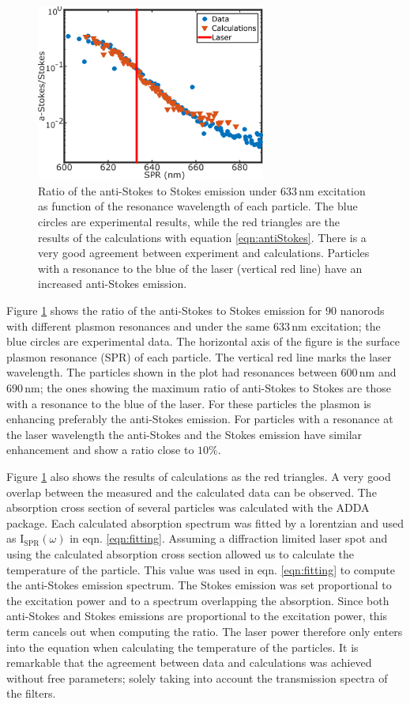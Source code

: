 \documentclass[journal=nalefd,manuscript=letter]{achemso}
\newcommand{\nm}{\ensuremath{\,\textrm{nm}}}
\begin{document}
\begin{figure}[tp] \centering
\includegraphics[width=75.5mm]{Figures/Supplementary/02_AS_vs_S_SPR/02_AS_vs_S_SPR.png}
\caption{Ratio of the anti-Stokes to Stokes emission under $633\nm$ excitation
as function of the resonance wavelength of each particle.
The blue circles are experimental results, while the red triangles are the
results of the calculations with equation \ref{eqn:antiStokes}. There is a very
good agreement between experiment and calculations. Particles with a resonance
to the blue of the laser (vertical red line) have an increased anti-Stokes
emission.}
	\label{fig:ASS-ratio}
\end{figure}

Figure \ref{fig:ASS-ratio} shows the ratio of the anti-Stokes to Stokes emission
for $90$ nanorods with different plasmon resonances and under the same $633\nm$
excitation; the blue circles are experimental data. The horizontal axis of the
figure is the surface plasmon resonance (SPR) of each particle. The vertical red
line marks the laser wavelength. The particles shown in the plot had resonances
between $600\nm$ and $690\nm$; the ones showing the maximum ratio of anti-Stokes
to Stokes are those with a resonance to the blue of the laser. For these
particles the plasmon is enhancing preferably the anti-Stokes emission. For
particles with a resonance at the laser wavelength the anti-Stokes and the
Stokes emission have similar enhancement and show a ratio close to $10\%$. 

Figure \ref{fig:ASS-ratio} also shows the results of calculations as the red
triangles. A very good overlap between the measured and the calculated data can
be observed. The absorption cross section of several particles was calculated
with the ADDA package\cite{Yurkin2011}. Each calculated absorption spectrum was
fitted by a lorentzian and used as $\textrm{I}_{\textrm{SPR}}(\omega)$ in eqn.
\ref{eqn:fitting}. Assuming a diffraction limited laser spot and using the
calculated absorption cross section allowed us to calculate the temperature of
the particle. This value was used in eqn. \ref{eqn:fitting} to compute the
anti-Stokes emission spectrum. The Stokes emission was set proportional to the
excitation power and to a spectrum overlapping the absorption. Since both
anti-Stokes and Stokes emissions are proportional to the excitation power, this
term cancels out when computing the ratio. The laser power therefore only enters
into the equation when calculating the temperature of the particles. It is
remarkable that the agreement between data and calculations was achieved
without free parameters; solely taking into account the transmission spectra of
the filters.
\end{document}
